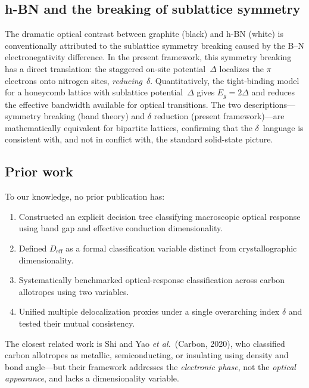 \documentclass[twocolumn,showpacs,preprintnumbers,amsmath,amssymb,prb]{revtex4-2}
\begin{document}
\subsection{h-BN and the breaking of sublattice symmetry}
\label{sec:hBN_discussion}

The dramatic optical contrast between graphite (black) and h-BN (white)
is conventionally attributed to the sublattice symmetry breaking caused
by the B--N electronegativity difference. In the present framework, this
symmetry breaking has a direct translation: the staggered on-site
potential~$\Delta$ localizes the $\pi$ electrons onto nitrogen sites,
\emph{reducing}~$\delta$. Quantitatively, the tight-binding model for a
honeycomb lattice with sublattice potential~$\Delta$ gives
$E_g = 2\Delta$ and reduces the effective bandwidth available for
optical transitions. The two descriptions---symmetry breaking (band
theory) and $\delta$ reduction (present framework)---are mathematically
equivalent for bipartite lattices, confirming that the $\delta$~language
is consistent with, and not in conflict with, the standard solid-state
picture.

\subsection{Prior work}

To our knowledge, no prior publication has:
\begin{enumerate}
  \item Constructed an explicit decision tree classifying macroscopic
    optical response using band gap and effective conduction
    dimensionality.
  \item Defined $D_\mathrm{eff}$ as a formal classification variable
    distinct from crystallographic dimensionality.
  \item Systematically benchmarked optical-response classification
    across carbon allotropes using two variables.
  \item Unified multiple delocalization proxies under a single
    overarching index $\delta$ and tested their mutual consistency.
\end{enumerate}

The closest related work is Shi and Yao \textit{et al.}\ (Carbon, 2020),
who classified carbon allotropes as metallic, semiconducting, or
insulating using density and bond angle---but their framework addresses
the \emph{electronic phase}, not the \emph{optical appearance}, and
lacks a dimensionality variable.
\end{document}
